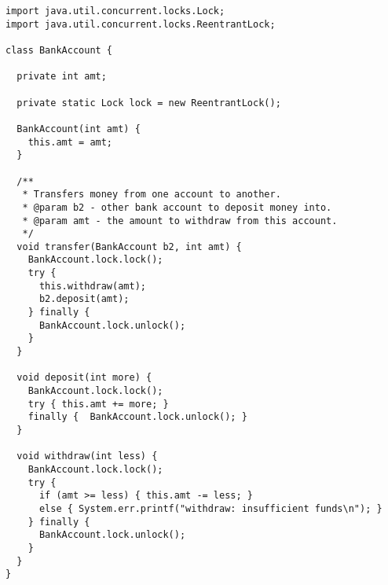 \begin{lstlisting}[language=MyJava]
import java.util.concurrent.locks.Lock;
import java.util.concurrent.locks.ReentrantLock;

class BankAccount {

  private int amt;

  private static Lock lock = new ReentrantLock();

  BankAccount(int amt) {
    this.amt = amt;
  }

  /**
   * Transfers money from one account to another.
   * @param b2 - other bank account to deposit money into.
   * @param amt - the amount to withdraw from this account.
   */
  void transfer(BankAccount b2, int amt) {
    BankAccount.lock.lock();
    try {
      this.withdraw(amt);
      b2.deposit(amt);
    } finally {
      BankAccount.lock.unlock();
    }
  }

  void deposit(int more) {
    BankAccount.lock.lock();
    try { this.amt += more; } 
    finally {  BankAccount.lock.unlock(); }
  }

  void withdraw(int less) {
    BankAccount.lock.lock();
    try {
      if (amt >= less) { this.amt -= less; }
      else { System.err.printf("withdraw: insufficient funds\n"); }
    } finally {
      BankAccount.lock.unlock();
    }
  }
}
\end{lstlisting}

